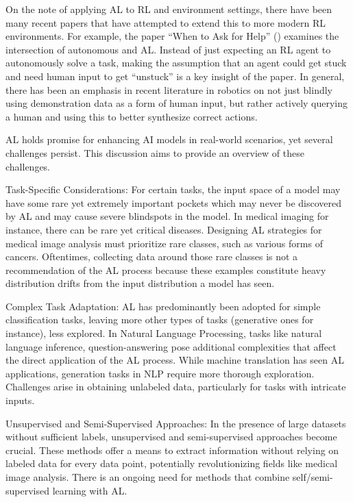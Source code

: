 \documentclass[
  letterpaper,
  numbers=noenddot,
  DIV=11]{scrreprt}
\theoremstyle{plain}
\theoremstyle{definition}
\theoremstyle{remark}
\begin{document}
On the note of applying AL to RL and environment settings, there have
been many recent papers that have attempted to extend this to more
modern RL environments. For example, the paper ``When to Ask for Help''
() examines the intersection of
autonomous and AL. Instead of just expecting an RL agent to autonomously
solve a task, making the assumption that an agent could get stuck and
need human input to get ``unstuck'' is a key insight of the paper. In
general, there has been an emphasis in recent literature in robotics on
not just blindly using demonstration data as a form of human input, but
rather actively querying a human and using this to better synthesize
correct actions.

AL holds promise for enhancing AI models in real-world scenarios, yet
several challenges persist. This discussion aims to provide an overview
of these challenges.

Task-Specific Considerations: For certain tasks, the input space of a
model may have some rare yet extremely important pockets which may never
be discovered by AL and may cause severe blindspots in the model. In
medical imaging for instance, there can be rare yet critical diseases.
Designing AL strategies for medical image analysis must prioritize rare
classes, such as various forms of cancers. Oftentimes, collecting data
around those rare classes is not a recommendation of the AL process
because these examples constitute heavy distribution drifts from the
input distribution a model has seen.

Complex Task Adaptation: AL has predominantly been adopted for simple
classification tasks, leaving more other types of tasks (generative ones
for instance), less explored. In Natural Language Processing, tasks like
natural language inference, question-answering pose additional
complexities that affect the direct application of the AL process. While
machine translation has seen AL applications, generation tasks in NLP
require more thorough exploration. Challenges arise in obtaining
unlabeled data, particularly for tasks with intricate inputs.

Unsupervised and Semi-Supervised Approaches: In the presence of large
datasets without sufficient labels, unsupervised and semi-supervised
approaches become crucial. These methods offer a means to extract
information without relying on labeled data for every data point,
potentially revolutionizing fields like medical image analysis. There is
an ongoing need for methods that combine self/semi-supervised learning
with AL.
\end{document}
